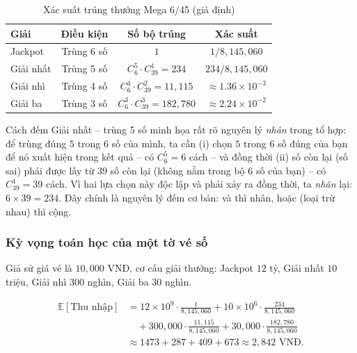 \documentclass[12pt,a4paper]{article}
\theoremstyle{coloredthm}
\theoremstyle{coloreddef}
\theoremstyle{remark}
\begin{document}
\begin{table}[H]
\centering
\caption{Xác suất trúng thưởng Mega 6/45 (giả định)}
\begin{tabular}{lccc}
\toprule
\textbf{Giải} & \textbf{Điều kiện} & \textbf{Số bộ trúng} & \textbf{Xác suất} \\
\midrule
Jackpot & Trùng 6 số & $1$ & $1/8{,}145{,}060$ \\
Giải nhất & Trùng 5 số & $C_6^5 \cdot C_{39}^1 = 234$ & $234/8{,}145{,}060$ \\
Giải nhì & Trùng 4 số & $C_6^4 \cdot C_{39}^2 = 11{,}115$ & $\approx 1.36\times 10^{-3}$ \\
Giải ba & Trùng 3 số & $C_6^3 \cdot C_{39}^3 = 182{,}780$ & $\approx 2.24\times 10^{-2}$ \\
\bottomrule
\end{tabular}
\end{table}

\begin{giaithich}
Cách đếm Giải nhất -- trùng 5 số minh họa rất rõ nguyên lý \emph{nhân} trong tổ hợp: để trùng đúng $5$ trong $6$ số của mình, ta cần (i) chọn $5$ trong $6$ số đúng của bạn để nó xuất hiện trong kết quả -- có $C_6^5 = 6$ cách -- và đồng thời (ii) số còn lại (số sai) phải được lấy từ $39$ số còn lại (không nằm trong bộ $6$ số của bạn) -- có $C_{39}^1 = 39$ cách. Vì hai lựa chọn này độc lập và phải xảy ra đồng thời, ta \emph{nhân} lại: $6 \times 39 = 234$. Đây chính là nguyên lý đếm cơ bản: và thì nhân, hoặc (loại trừ nhau) thì cộng.
\end{giaithich}

\subsubsection{Kỳ vọng toán học của một tờ vé số}

Giả sử giá vé là $10{,}000$ VNĐ, cơ cấu giải thưởng:
Jackpot $12$ tỷ, Giải nhất $10$ triệu, Giải nhì $300$ nghìn, Giải ba $30$ nghìn.

\begin{align*}
\mathbb{E}[\text{Thu nhập}] &= 12\!\times\!10^9 \cdot \tfrac{1}{8{,}145{,}060}
+ 10\!\times\!10^6 \cdot \tfrac{234}{8{,}145{,}060} \\
&\quad + 300{,}000 \cdot \tfrac{11{,}115}{8{,}145{,}060}
+ 30{,}000 \cdot \tfrac{182{,}780}{8{,}145{,}060} \\
&\approx 1473 + 287 + 409 + 673 \approx 2{,}842 \text{ VNĐ}.
\end{align*}
\end{document}
